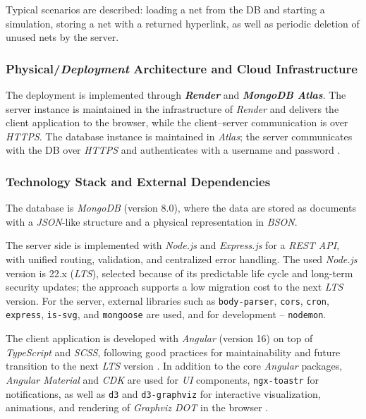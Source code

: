 	\hspace*{2.5em}Typical scenarios are described: loading a net from the DB and starting a simulation, storing a net with a returned hyperlink, as well as periodic deletion of unused nets by the server.
	
	\subsubsection{Physical/\textit{Deployment} Architecture and Cloud Infrastructure}
	\hspace*{2.5em}The deployment is implemented through \textbf{\textit{Render}} and \textbf{\textit{MongoDB Atlas}}. The server instance is maintained in the infrastructure of \textit{Render} and delivers the client application to the browser, while the client--server communication is over \textit{HTTPS}. The database instance is maintained in \textit{Atlas}; the server communicates with the DB over \textit{HTTPS} and authenticates with a username and password \cite{DIS-RenderWebServices,MongoDBAtlasDocs}.
	
	\subsubsection{Technology Stack and External Dependencies}
	\hspace*{2.5em}The database is \textit{MongoDB} (version 8.0), where the data are stored as documents with a \textit{JSON}-like structure and a physical representation in \textit{BSON}.
	
	The server side is implemented with \textit{Node.js} and \textit{Express.js} for a \textit{REST API}, with unified routing, validation, and centralized error handling. The used \textit{Node.js} version is 22.x (\textit{LTS}), selected because of its predictable life cycle and long-term security updates; the approach supports a low migration cost to the next \textit{LTS} version. For the server, external libraries such as \texttt{body-parser}, \texttt{cors}, \texttt{cron}, \texttt{express}, \texttt{is-svg}, and \texttt{mongoose} are used, and for development -- \texttt{nodemon}.
	
	The client application is developed with \textit{Angular} (version 16) on top of \textit{TypeScript} and \textit{SCSS}, following good practices for maintainability and future transition to the next \textit{LTS} version \cite{DIS-AngularDocs,DIS-TypeScriptHandbook}. In addition to the core \textit{Angular} packages, \textit{Angular Material} and \textit{CDK} are used for \textit{UI} components, \texttt{ngx-toastr} for notifications, as well as \texttt{d3} and \texttt{d3-graphviz} for interactive visualization, animations, and rendering of \textit{Graphviz DOT} in the browser \cite{DIS-D3Transition}.
	
